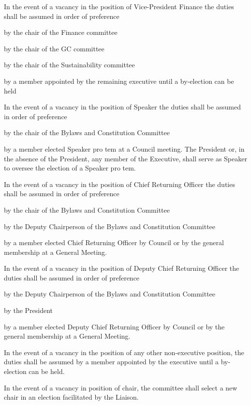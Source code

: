 \begin{longenum}[ label*=\thesubsection.\arabic*., align=left]
\begin{longenum}[ label*=\arabic*., align=left]
			\item In the event of a vacancy in the position of Vice-President Finance the duties shall be assumed in order of preference
			\begin{longenum}[ label*=\arabic*., align=left]
				\item by the chair of the Finance committee
				\item by the chair of the GC committee
				\item by the chair of the Sustainability committee
				\item by a member appointed by the remaining executive until a by-election can be held
			\end{longenum}
			\item In the event of a vacancy in the position of Speaker the duties shall be assumed in order of preference
			\begin{longenum}[ label*=\arabic*., align=left]
				\item by the chair of the Bylaws and Constitution Committee
				\item by a member elected Speaker pro tem at a Council meeting. The President or, in the absence of the President, any member of the Executive, shall serve as Speaker to oversee the election of a Speaker pro tem.
			\end{longenum}
			\item In the event of a vacancy in the position of Chief Returning Officer the duties shall be assumed in order of preference
			\begin{longenum}[ label*=\arabic*., align=left]
				\item by the chair of the Bylaws and Constitution Committee
				\item by the Deputy Chairperson of the Bylaws and Constitution Committee
				\item by a member elected Chief Returning Officer by Council or by the general membership at a General Meeting.
			\end{longenum}
			\item In the event of a vacancy in the position of Deputy Chief Returning Officer the duties shall be assumed in order of preference
			\begin{longenum}[ label*=\arabic*., align=left]
				\item by the Deputy Chairperson of the Bylaws and Constitution Committee
				\item by the President
				\item by a member elected Deputy Chief Returning Officer by Council or by the general membership at a General Meeting.
			\end{longenum}
			\item In the event of a vacancy in the position of any other non-executive position, the duties shall be assumed by a member appointed by the executive until a by-election can be held.
			\item In the event of a vacancy in position of chair, the committee shall select a new chair in an election facilitated by the Liaison.
		\end{longenum}
	\end{longenum}
